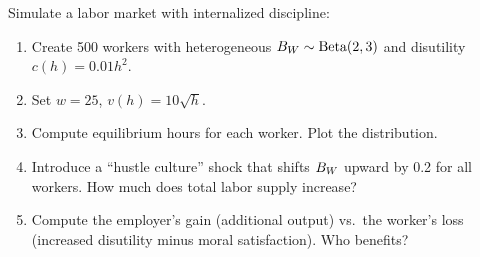 \begin{exercise}[Computational]
Simulate a labor market with internalized discipline:
\begin{enumerate}[nosep]
  \item Create 500 workers with heterogeneous $B_{W} \sim \text{Beta}(2, 3)$ and disutility $c(h) = 0.01 h^2$.
  \item Set $w = 25$, $v(h) = 10 \sqrt{h}$.
  \item Compute equilibrium hours for each worker. Plot the distribution.
  \item Introduce a ``hustle culture'' shock that shifts $B_{W}$ upward by 0.2 for all workers. How much does total labor supply increase?
  \item Compute the employer's gain (additional output) vs.\ the worker's loss (increased disutility minus moral satisfaction). Who benefits?
\end{enumerate}
\end{exercise}
